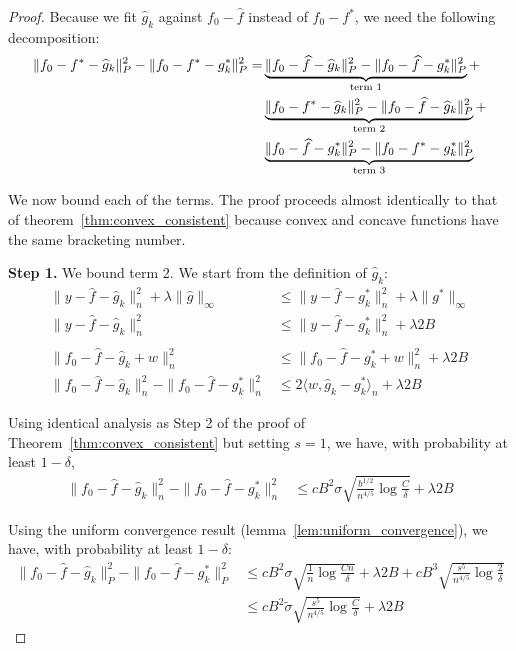 \begin{proof}

Because we fit $\hat{g}_k$ against $f_0 - \hat{f}$ instead of $f_0 - f^*$, we need the following decomposition:
\begin{align}
\| f_0 - f^* - \widehat{g}_k \|_P^2 - \| f_0 - f^* - g^*_k \|_P^2 = & \underbrace{\| f_0 - \widehat{f} - \widehat{g}_k \|_P^2 - \| f_0 - \widehat{f} - g^*_k \|_P^2}_{\textrm{term 1}} + \nonumber \\
   & \underbrace{\| f_0 - f^* - \widehat{g}_k \|_P^2 - \| f_0 - \widehat{f} - \widehat{g}_k \|_P^2}_{\textrm{term 2}} + \nonumber \\
   & \underbrace{\| f_0 - \widehat{f} - g^*_k \|_P^2 - \| f_0 - f^* - g^*_k \|_P^2}_{\textrm{term 3}}  \label{eqn:concave_init_decomposition}
\end{align}

We now bound each of the terms. The proof proceeds almost identically to that of theorem~\ref{thm:convex_consistent} because convex and concave functions have the same bracketing number.

\textbf{Step 1.} We bound term 2. We start from the definition of $\hat{g}_k$:
\begin{align*}
\| y - \hat{f} - \hat{g}_k \|_n^2 + \lambda \| \hat{g} \|_\infty &\leq
   \| y - \hat{f} - g^*_k \|_n^2 + \lambda \| g^* \|_\infty \\
\| y - \hat{f} - \hat{g}_k \|_n^2 &\leq \| y - \hat{f} - g^*_k \|_n^2 + \lambda 2B \\
 &\\
\| f_0 - \hat{f} - \hat{g}_k + w\|_n^2 & \leq \| f_0 - \hat{f} - g^*_k + w \|_n^2 
   +\lambda 2 B \\
\| f_0 - \hat{f} - \hat{g}_k \|_n^2 - \|f_0 -\hat{f} - g^*_k\|_n^2 &\leq
   2 \langle w, \hat{g}_k - g^*_k \rangle_n + \lambda 2B
\end{align*}

Using identical analysis as Step 2 of the proof of Theorem~\ref{thm:convex_consistent} but setting $s=1$, we have, with probability at least $1-\delta$,
\begin{align*}
\| f_0 - \hat{f} - \hat{g}_k \|_n^2 - \|f_0 - \hat{f} - g^*_k \|_n^2 &\leq
  c B^2 \sigma \sqrt{ \frac{b^{1/2}}{n^{4/5}} \log \frac{C}{\delta} }+ \lambda 2 B
\end{align*}

Using the uniform convergence result (lemma~\ref{lem:uniform_convergence}), we have, with probability at least $1-\delta$:
\begin{align*}
\| f_0 - \hat{f} - \hat{g}_k \|_P^2 - \|f_0 - \hat{f} - g^*_k \|_P^2 &\leq
  c B^2 \sigma \sqrt{ \frac{1}{n} \log \frac{Cn}{\delta} }+ \lambda 2 B +
  c B^3 \sqrt{\frac{s^5}{n^{4/5}} \log \frac{2}{\delta} } \\
 &\leq c B^2 \tilde{\sigma} \sqrt{\frac{s^5}{n^{4/5}} \log \frac{C}{\delta}}+ \lambda 2B
\end{align*}


\end{proof}
